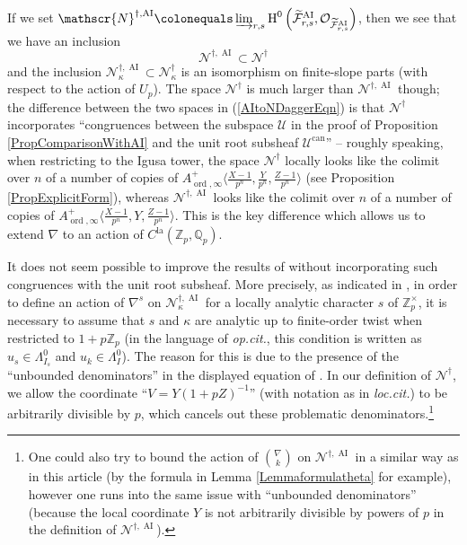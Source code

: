 \documentclass[10pt, oneside]{amsart}
\newcommand{\defeq}{\colonequals}
\renewcommand{\tilde}{\widetilde}
\numberwithin{equation}{subsection}
\theoremstyle{definition}
\theoremstyle{remark}
\newcommand{\mbb}[1]{\mathbb{#1}}
\newcommand{\opn}[1]{\operatorname{#1}}
\begin{document}
If we set $\mathscr{N}^{\dagger, \opn{AI}} \defeq \varinjlim_{r, s} \opn{H}^0\left( \tilde{\mathcal{F}}_{r, s}^{\opn{AI}}, \mathcal{O}_{\tilde{\mathcal{F}}_{r, s}^{\opn{AI}}} \right)$, then we see that we have an inclusion
\begin{equation} \label{AItoNDaggerEqn}
\mathscr{N}^{\dagger, \opn{AI}} \subset \mathscr{N}^{\dagger}
\end{equation}
and the inclusion $\mathscr{N}_{\kappa}^{\dagger, \opn{AI}} \subset \mathscr{N}^{\dagger}_{\kappa}$ is an isomorphism on finite-slope parts (with respect to the action of $U_p$). The space $\mathscr{N}^{\dagger}$ is much larger than $\mathscr{N}^{\dagger, \opn{AI}}$ though; the difference between the two spaces in (\ref{AItoNDaggerEqn}) is that $\mathscr{N}^{\dagger}$ incorporates ``congruences between the subspace $\mathcal{U}$ in the proof of Proposition \ref{PropComparisonWithAI} and the unit root subsheaf $\mathcal{U}^{\opn{can}}$'' -- roughly speaking, when restricting to the Igusa tower, the space $\mathscr{N}^{\dagger}$ locally looks like the colimit over $n$ of a number of copies of $A_{\opn{ord}, \infty}^+ \langle \frac{X-1}{p^n}, \frac{Y}{p^n}, \frac{Z-1}{p^n} \rangle $ (see Proposition \ref{PropExplicitForm}), whereas $\mathscr{N}^{\dagger, \opn{AI}}$ looks like the colimit over $n$ of a number of copies of $A_{\opn{ord}, \infty}^+ \langle \frac{X-1}{p^n}, Y, \frac{Z-1}{p^n} \rangle $. This is the key difference which allows us to extend $\nabla$ to an action of $C^{\opn{la}}(\mbb{Z}_p, \mbb{Q}_p)$. 

It does not seem possible to improve the results of \cite{AI_LLL} without incorporating such congruences with the unit root subsheaf. More precisely, as indicated in \cite[Remark 3.39]{AI_LLL}, in order to define an action of $\nabla^s$ on $\mathscr{N}_{\kappa}^{\dagger, \opn{AI}}$ for a locally analytic character $s$ of $\mbb{Z}_p^{\times}$, it is necessary to assume that $s$ and $\kappa$ are analytic up to finite-order twist when restricted to $1 + p\mbb{Z}_p$ (in the language of \emph{op.cit.}, this condition is written as $u_s \in \Lambda_{I_s}^0$ and $u_k \in \Lambda_I^0$). The reason for this is due to the presence of the ``unbounded denominators'' in the displayed equation of \cite[Remark 3.39]{AI_LLL}. In our definition of $\mathscr{N}^{\dagger}$, we allow the coordinate ``$V = Y(1+pZ)^{-1}$'' (with notation as in \emph{loc.cit.}) to be arbitrarily divisible by $p$, which cancels out these problematic denominators.\footnote{One could also try to bound the action of $\binom{\nabla}{k}$ on $\mathscr{N}^{\dagger, \opn{AI}}$ in a similar way as in this article (by the formula in Lemma \ref{Lemmaformulatheta} for example), however one runs into the same issue with ``unbounded denominators'' (because the local coordinate $Y$ is not arbitrarily divisible by powers of $p$ in the definition of $\mathscr{N}^{\dagger, \opn{AI}}$).} 
\end{document}
